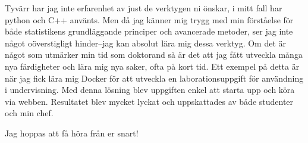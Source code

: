 \documentclass[11pt, a4paper]{../awesome-cv} %
\begin{document}
\begin{cvletter}
Tyvärr har jag inte erfarenhet av just de verktygen ni önskar, i mitt fall har python och C++ använts.
Men då jag känner mig trygg med min förståelse för både statistikens grundläggande principer och avancerade metoder, ser jag inte något oöverstigligt hinder–jag kan absolut lära mig dessa verktyg.
Om det är något som utmärker min tid som doktorand så är det att jag fått utveckla många nya färdigheter och lära mig nya saker, ofta på kort tid.
Ett exempel på detta är när jag fick lära mig Docker för att utveckla en laborationsuppgift för användning i undervisning. 
Med denna lösning blev uppgiften enkel att starta upp och köra via webben.
Resultatet blev mycket lyckat och uppskattades av både studenter och min chef.


Jag hoppas att få höra från er snart!

\end{cvletter}


\makeletterclosing %
\end{document}
